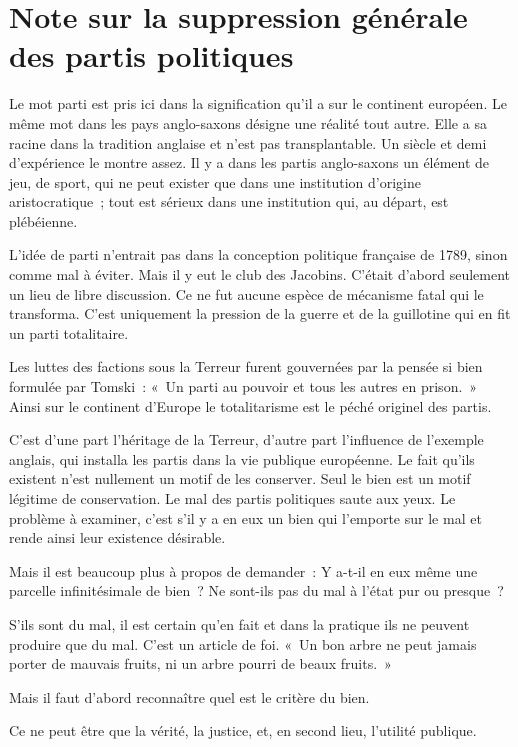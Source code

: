 \documentclass[french,twoside]{book} %
\begin{document}
  \chapter[Note sur la suppression générale des partis politiques]{Note sur la suppression générale des partis politiques}
\noindent Le mot parti est pris ici dans la signification qu’il a sur le continent européen. Le même mot dans les pays anglo-saxons désigne une réalité tout autre. Elle a sa racine dans la tradition anglaise et n’est pas transplantable. Un siècle et demi d’expérience le montre assez. Il y a dans les partis anglo-saxons un élément de jeu, de sport, qui ne peut exister que dans une institution d’origine aristocratique ; tout est sérieux dans une institution qui, au départ, est plébéienne.\par
L’idée de parti n’entrait pas dans la conception politique française de 1789, sinon comme mal à éviter. Mais il y eut le club des Jacobins. C’était d’abord seulement un lieu de libre discussion. Ce ne fut aucune espèce de mécanisme fatal qui le transforma. C’est uniquement la pression de la guerre et de la guillotine qui en fit un parti totalitaire.\par
Les luttes des factions sous la Terreur furent gouvernées par la pensée si bien formulée par Tomski : « Un parti au pouvoir et tous les autres en prison. » Ainsi sur le continent d’Europe le totalitarisme est le péché originel des partis.\par
C’est d’une part l’héritage de la Terreur, d’autre part l’influence de l’exemple anglais, qui installa les partis dans la vie publique européenne. Le fait qu’ils existent n’est nullement un motif de les conserver. Seul le bien est un motif légitime de conservation. Le mal des partis politiques saute aux yeux. Le problème à examiner, c’est s’il y a en eux un bien qui l’emporte sur le mal et rende ainsi leur existence désirable.\par
Mais il est beaucoup plus à propos de demander : Y a-t-il en eux même une parcelle infinitésimale de bien ? Ne sont-ils pas du mal à l’état pur ou presque ?\par
S’ils sont du mal, il est certain qu’en fait et dans la pratique ils ne peuvent produire que du mal. C’est un article de foi. « Un bon arbre ne peut jamais porter de mauvais fruits, ni un arbre pourri de beaux fruits. »\par
Mais il faut d’abord reconnaître quel est le critère du bien.\par
Ce ne peut être que la vérité, la justice, et, en second lieu, l’utilité publique.\par
\end{document}
